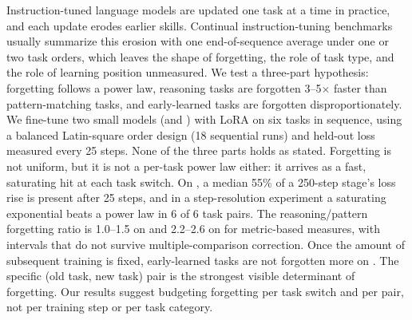 Instruction-tuned language models are updated one task at a time in practice, and each update erodes earlier skills.
Continual instruction-tuning benchmarks usually summarize this erosion with one end-of-sequence average under one or two task orders, which leaves the shape of forgetting, the role of task type, and the role of learning position unmeasured.
We test a three-part hypothesis: forgetting follows a power law, reasoning tasks are forgotten 3--5$\times$ faster than pattern-matching tasks, and early-learned tasks are forgotten disproportionately.
We fine-tune two small models (\llama and \qwen) with LoRA on six tasks in sequence, using a balanced Latin-square order design (18 sequential runs) and held-out loss measured every 25 steps.
None of the three parts holds as stated.
Forgetting is not uniform, but it is not a per-task power law either: it arrives as a fast, saturating hit at each task switch.
On \llama, a median 55\% of a 250-step stage's loss rise is present after 25 steps, and in a step-resolution experiment a saturating exponential beats a power law in 6 of 6 task pairs.
The reasoning/pattern forgetting ratio is 1.0--1.5 on \llama and 2.2--2.6 on \qwen for metric-based measures, with intervals that do not survive multiple-comparison correction.
Once the amount of subsequent training is fixed, early-learned tasks are not forgotten more on \llama.
The specific (old task, new task) pair is the strongest visible determinant of forgetting.
Our results suggest budgeting forgetting per task switch and per pair, not per training step or per task category.
